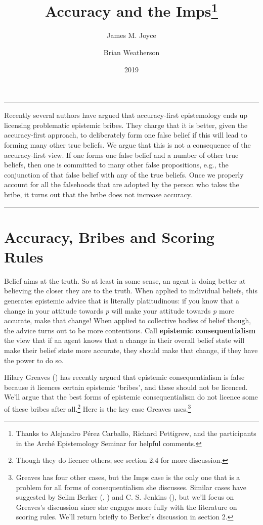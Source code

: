 \documentclass[
  10pt,
  letterpaper,
  DIV=11,
  numbers=noendperiod,
  twoside]{scrartcl}
\title{Accuracy and the Imps\thanks{Thanks to Alejandro Pérez Carballo,
Richard Pettigrew, and the participants in the Arché Epistemology
Seminar for helpful comments.}}
\author{James M. Joyce \and Brian Weatherson}
\date{2019}
\renewenvironment{abstract}
 {\vspace{-1.25cm}
 \quotation\small\noindent\rule{\linewidth}{.5pt}\par\smallskip
 \noindent }
 {\par\noindent\rule{\linewidth}{.5pt}\endquotation}
\begin{document}
\maketitle
\begin{abstract}
Recently several authors have argued that accuracy-first epistemology
ends up licensing problematic epistemic bribes. They charge that it is
better, given the accuracy-first approach, to deliberately form one
false belief if this will lead to forming many other true beliefs. We
argue that this is not a consequence of the accuracy-first view. If one
forms one false belief and a number of other true beliefs, then one is
committed to many other false propositions, e.g., the conjunction of
that false belief with any of the true beliefs. Once we properly account
for all the falsehoods that are adopted by the person who takes the
bribe, it turns out that the bribe does not increase accuracy.
\end{abstract}


\section{Accuracy, Bribes and Scoring
Rules}\label{accuracybribesandscoringrules}

Belief aims at the truth. So at least in some sense, an agent is doing
better at believing the closer they are to the truth. When applied to
individual beliefs, this generates epistemic advice that is literally
platitudinous: if you know that a change in your attitude towards
\emph{p} will make your attitude towards \emph{p} more accurate, make
that change! When applied to collective bodies of belief though, the
advice turns out to be more contentious. Call \textbf{epistemic
consequentialism} the view that if an agent knows that a change in their
overall belief state will make their belief state more accurate, they
should make that change, if they have the power to do so.

Hilary Greaves () has recently argued
that epistemic consequentialism is false because it licences certain
epistemic `bribes', and these should not be licenced. We'll argue that
the best forms of epistemic consequentialism do not licence some of
these bribes after all.\footnote{Though they do licence others; see
  section 2.4 for more discussion.} Here is the key case Greaves
uses.\footnote{Greaves has four other cases, but the Imps case is the
  only one that is a problem for all forms of consequentialism she
  discusses. Similar cases have suggested by Selim Berker
  (, )
  and C. S. Jenkins (), but we'll focus
  on Greaves's discussion since she engages more fully with the
  literature on scoring rules. We'll return briefly to Berker's
  discussion in section 2.}
\end{document}
